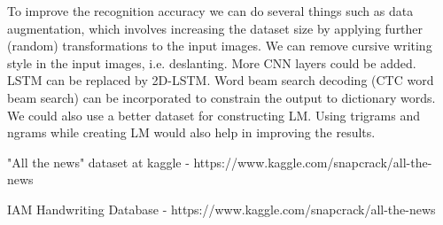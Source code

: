 \documentclass[a4paper, 10pt,twocolumn]{article}
\begin{document}
To improve the recognition accuracy we can do several things such as data augmentation, which involves increasing the dataset size by applying further (random) transformations to the input images. We can remove cursive writing style in the input images, i.e. deslanting. More CNN layers could be added. LSTM can be replaced by 2D-LSTM. Word beam search decoding (CTC word beam search) can be incorporated to constrain the output to dictionary words. We could also use a better dataset for constructing LM. Using trigrams and ngrams while creating LM would also help in improving the results.

\begin{thebibliography}{9}
	

 "All the news" dataset at kaggle - https://www.kaggle.com/snapcrack/all-the-news

 IAM Handwriting Database - https://www.kaggle.com/snapcrack/all-the-news


\end{thebibliography}
\end{document}
